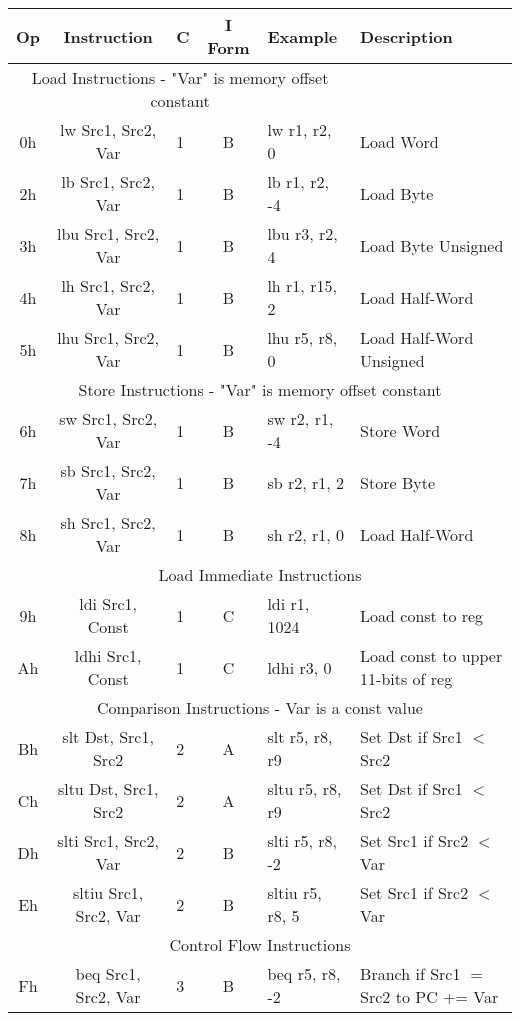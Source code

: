 \documentclass[]{article}
\begin{document}
\begin{longtable}{|c|c|l|c|l|p{5cm}|}
	\hline
	Op & Instruction & C & I Form & Example & Description \\
	\hline
	\multicolumn{5}{|c|}{Load Instructions - "Var" is memory offset constant} \\
	\hline
	0h & lw Src1, Src2, Var & 1 & B & lw r1, r2, 0 & Load Word \\
	\hline
	2h & lb Src1, Src2, Var & 1 & B & lb r1, r2, -4 & Load Byte\\
	\hline
	3h & lbu Src1, Src2, Var & 1 & B & lbu r3, r2, 4 & Load Byte Unsigned \\
	\hline
	4h & lh Src1, Src2, Var & 1 & B & lh r1, r15, 2 & Load Half-Word \\
	\hline
	5h & lhu Src1, Src2, Var & 1 & B & lhu r5, r8, 0 & Load Half-Word Unsigned \\
	\hline
	\multicolumn{6}{|c|}{Store Instructions - "Var" is memory offset constant} \\
	\hline
	6h & sw Src1, Src2, Var & 1 & B & sw r2, r1, -4 & Store Word \\
	\hline
	7h & sb Src1, Src2, Var & 1 & B & sb r2, r1, 2 & Store Byte \\
	\hline
	8h & sh Src1, Src2, Var & 1 & B & sh r2, r1, 0 & Load Half-Word \\
	\hline
	\multicolumn{6}{|c|}{Load Immediate Instructions} \\
	\hline
	9h & ldi Src1, Const & 1 & C & ldi r1, 1024 & Load const to reg \\
	\hline
	Ah & ldhi Src1, Const & 1 & C & ldhi r3, 0 & Load const to upper 11-bits of reg \\
	\hline
	\multicolumn{6}{|c|}{Comparison Instructions - Var is a const value} \\
	\hline
	Bh & slt Dst, Src1, Src2 & 2 & A & slt r5, r8, r9 & Set Dst if Src1 $<$ Src2 \\
	\hline
	Ch & sltu Dst, Src1, Src2 & 2 & A & sltu r5, r8, r9 & Set Dst if Src1 $<$ Src2 \\
	\hline
	Dh & slti Src1, Src2, Var & 2 & B & slti r5, r8, -2 & Set Src1 if Src2 $<$ Var \\
	\hline
	Eh & sltiu Src1, Src2, Var & 2 & B & sltiu r5, r8, 5 & Set Src1 if Src2 $<$ Var \\
	\multicolumn{6}{|c|}{Control Flow Instructions} \\
	\hline
	Fh & beq Src1, Src2, Var & 3 & B & beq r5, r8, -2 & Branch if Src1 $=$ Src2 to PC += Var \\
	\hline

\end{longtable}
\end{document}
